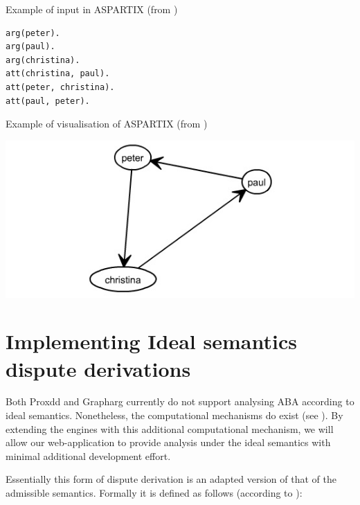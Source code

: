 \begin{exmp} Example of input in ASPARTIX (from \cite{aspartixsys}) \label{exmp_aspartixin}
\begin{verbatim}
arg(peter).
arg(paul).
arg(christina).
att(christina, paul).
att(peter, christina).
att(paul, peter).                  
\end{verbatim}
\end{exmp}

\begin{exmp} Example of visualisation of ASPARTIX (from \cite{aspartixsys}) \label{exmp_aspartixout}

\includegraphics[width=\linewidth]{aspartix}

\end{exmp}

\section{Implementing Ideal semantics dispute derivations} \label{subsec:ideal}
Both Proxdd and Grapharg currently do not support analysing ABA according to ideal semantics. Nonetheless, the computational mechanisms do exist (see \cite{idealsem}). By extending the engines with this additional computational mechanism, we will allow our web-application to provide analysis under the ideal semantics with minimal additional development effort. 

Essentially this form of dispute derivation is an adapted version of that of the admissible semantics. Formally it is defined as follows (according to \cite{idealsem}):
\newline

